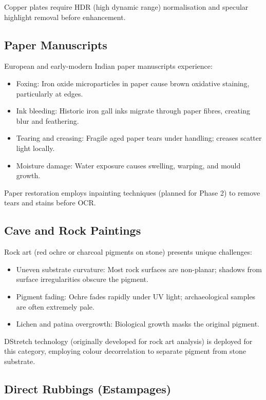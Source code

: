 Copper plates require HDR (high dynamic range) normalisation and specular highlight removal before enhancement.

\subsection{Paper Manuscripts}

European and early-modern Indian paper manuscripts experience:

\begin{itemize}
	\item Foxing: Iron oxide microparticles in paper cause brown oxidative staining, particularly at edges.
	\item Ink bleeding: Historic iron gall inks migrate through paper fibres, creating blur and feathering.
	\item Tearing and creasing: Fragile aged paper tears under handling; creases scatter light locally.
	\item Moisture damage: Water exposure causes swelling, warping, and mould growth.
\end{itemize}

Paper restoration employs inpainting techniques (planned for Phase 2) to remove tears and stains before OCR.

\subsection{Cave and Rock Paintings}

Rock art (red ochre or charcoal pigments on stone) presents unique challenges:

\begin{itemize}
	\item Uneven substrate curvature: Most rock surfaces are non-planar; shadows from surface irregularities obscure the pigment.
	\item Pigment fading: Ochre fades rapidly under UV light; archaeological samples are often extremely pale.
	\item Lichen and patina overgrowth: Biological growth masks the original pigment.
\end{itemize}

DStretch technology (originally developed for rock art analysis) is deployed for this category, employing colour decorrelation to separate pigment from stone substrate.

\subsection{Direct Rubbings (Estampages)}

